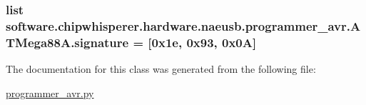 \subsubsection[{signature}]{\setlength{\rightskip}{0pt plus 5cm}list software.\+chipwhisperer.\+hardware.\+naeusb.\+programmer\+\_\+avr.\+A\+T\+Mega88\+A.\+signature = \mbox{[}0x1e, 0x93, 0x0\+A\mbox{]}\hspace{0.3cm}{\ttfamily [static]}}\label{classsoftware_1_1chipwhisperer_1_1hardware_1_1naeusb_1_1programmer__avr_1_1ATMega88A_acc0af2cd29e9a889f66d8b0a4ad1200b}


The documentation for this class was generated from the following file\+:\begin{DoxyCompactItemize}
\item 
\hyperlink{programmer__avr_8py}{programmer\+\_\+avr.\+py}\end{DoxyCompactItemize}
